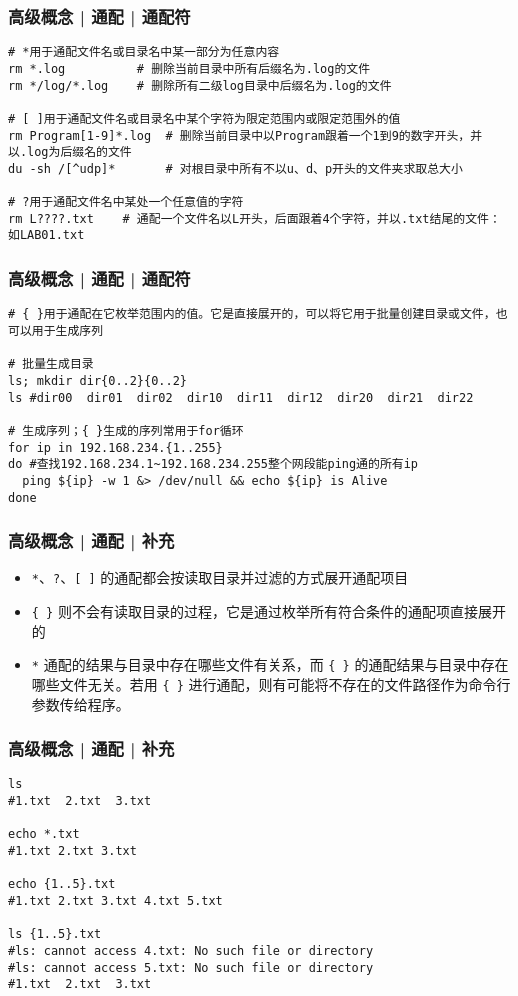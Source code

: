 \begin{frame}[fragile]
  \frametitle{高级概念 | 通配 | 通配符}
  \vspace{-0.5em}
\begin{lstlisting}
# *用于通配文件名或目录名中某一部分为任意内容
rm *.log          # 删除当前目录中所有后缀名为.log的文件
rm */log/*.log    # 删除所有二级log目录中后缀名为.log的文件

# [ ]用于通配文件名或目录名中某个字符为限定范围内或限定范围外的值
rm Program[1-9]*.log  # 删除当前目录中以Program跟着一个1到9的数字开头，并以.log为后缀名的文件
du -sh /[^udp]*       # 对根目录中所有不以u、d、p开头的文件夹求取总大小

# ?用于通配文件名中某处一个任意值的字符
rm L????.txt    # 通配一个文件名以L开头，后面跟着4个字符，并以.txt结尾的文件：如LAB01.txt
\end{lstlisting}
\end{frame}

\begin{frame}[fragile]
  \frametitle{高级概念 | 通配 | 通配符}
\begin{lstlisting}
# { }用于通配在它枚举范围内的值。它是直接展开的，可以将它用于批量创建目录或文件，也可以用于生成序列

# 批量生成目录
ls; mkdir dir{0..2}{0..2}
ls #dir00  dir01  dir02  dir10  dir11  dir12  dir20  dir21  dir22

# 生成序列；{ }生成的序列常用于for循环
for ip in 192.168.234.{1..255}
do #查找192.168.234.1~192.168.234.255整个网段能ping通的所有ip
  ping ${ip} -w 1 &> /dev/null && echo ${ip} is Alive
done
\end{lstlisting}
\end{frame}

\begin{frame}[fragile]
  \frametitle{高级概念 | 通配 | 补充}
  \begin{itemize}
    \item \verb|*|、\verb|?|、\verb|[ ]| 的通配都会按读取目录并过滤的方式展开通配项目
    \item \verb|{ }| 则不会有读取目录的过程，它是通过枚举所有符合条件的通配项直接展开的
    \item \verb|*| 通配的结果与目录中存在哪些文件有关系，而 \verb|{ }| 的通配结果与目录中存在哪些文件无关。若用 \verb|{ }| 进行通配，则有可能将不存在的文件路径作为命令行参数传给程序。
  \end{itemize}
\end{frame}

\begin{frame}[fragile]
  \frametitle{高级概念 | 通配 | 补充}
\begin{lstlisting}
ls
#1.txt  2.txt  3.txt

echo *.txt
#1.txt 2.txt 3.txt

echo {1..5}.txt
#1.txt 2.txt 3.txt 4.txt 5.txt

ls {1..5}.txt
#ls: cannot access 4.txt: No such file or directory
#ls: cannot access 5.txt: No such file or directory
#1.txt  2.txt  3.txt
\end{lstlisting}
\end{frame}

